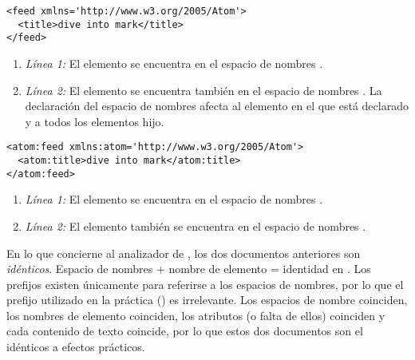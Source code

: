 \noindent\begin{minipage}{\textwidth}
\begin{lstlisting}[mathescape=True]
<feed xmlns='http://www.w3.org/2005/Atom'>
  <title>dive into mark</title>
</feed>
\end{lstlisting}
\end{minipage}

\begin{enumerate}

\item \emph{Línea 1:} El elemento  se encuentra en el espacio de nombres .

\item \emph{Línea 2:} El elemento  se encuentra también en el espacio de nombres . La declaración del espacio de nombres afecta al elemento en el que está declarado y a todos los elementos hijo.

\end{enumerate}


\noindent\begin{minipage}{\textwidth}
\begin{lstlisting}[mathescape=True]
<atom:feed xmlns:atom='http://www.w3.org/2005/Atom'>
  <atom:title>dive into mark</atom:title>
</atom:feed>
\end{lstlisting}
\end{minipage}

\begin{enumerate}

\item \emph{Línea 1:} El elemento  se encuentra en el espacio de nombres .

\item \emph{Línea 2:} El elemento  también se encuentra en el espacio de nombres .

\end{enumerate}

En lo que concierne al analizador de , los dos documentos anteriores son \emph{idénticos}. Espacio de nombres + nombre de elemento = identidad en . Los prefijos existen únicamente para referirse a los espacios de nombres, por lo que el prefijo utilizado en la práctica () es irrelevante. Los espacios de nombre coinciden, los nombres de elemento coinciden, los atributos (o falta de ellos) coinciden y cada contenido de texto coincide, por lo que estos dos documentos  son el idénticos a efectos prácticos.

